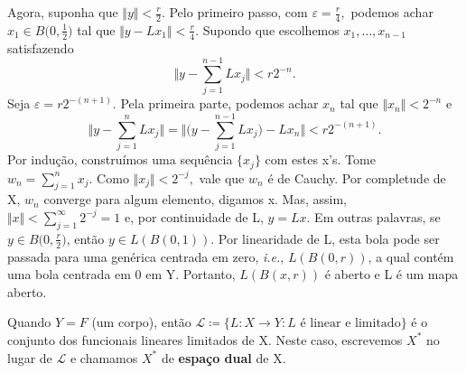 \documentclass[measure_theory.tex]{subfiles}
\begin{document}
\begin{proof*}
	Agora, suponha que \(\Vert y \Vert < \frac{r}{2}.\) Pelo primeiro passo, com \(\varepsilon  = \frac{r}{4}, \) podemos achar \(x_1\in B \biggl(0, \frac{1}{2}\biggr)\) tal que \(\Vert y - Lx_1 \Vert < \frac{r}{4}.\) Supondo que escolhemos \(x_1, \dotsc , x_{n-1}\) satisfazendo
	\[
		\biggl\Vert y - \sum\limits_{j=1}^{n-1}Lx_{j} \biggr\Vert < r2^{-n}.
	\]
	Seja \(\varepsilon  = r2^{-(n+1)}.\) Pela primeira parte, podemos achar \(x_{n}\) tal que \(\Vert x_{n} \Vert < 2^{-n}\) e
	\[
		\biggl\Vert y - \sum\limits_{j=1}^{n}Lx_{j} \biggr\Vert = \biggl\Vert \biggl(y - \sum\limits_{j=1}^{n-1}Lx_{j}\biggr) - Lx_{n} \biggr\Vert < r2^{-(n+1)}.
	\]
	Por indução, construímos uma sequência \(\{x_{j}\}\) com estes x's. Tome \(w_{n} = \sum\limits_{j=1}^{n}x_{j}.\) Como \(\Vert x_{j} \Vert < 2^{-j},\) vale que \(w_{n}\) é de Cauchy. Por completude de X, \(w_{n}\) converge para algum elemento, digamos x. Mas, assim, \(\Vert x \Vert <
	\sum\limits_{j=1}^{\infty} 2^{-j} = 1\) e, por continuidade de L, \(y = Lx\). Em outras palavras, se \(y\in B \biggl(0, \frac{r}{2}\biggr)\), então \(y\in L(B(0, 1))\). Por linearidade de L, esta bola pode ser passada para uma genérica centrada em zero, \textit{i.e.}, \(L(B(0, r))\), a qual contém
	uma bola centrada em 0 em Y. Portanto, \(L(B(x, r))\) é aberto e L é um mapa aberto. \qedsymbol
\end{proof*}
Quando \(Y = F\) (um corpo), então \(\mathcal{L}\coloneqq \{L:X\rightarrow Y: L \text{ é linear e limitado}\}\) é o conjunto dos funcionais lineares limitados de X. Neste caso, escrevemos \(X^{*}\) no lugar de \(\mathcal{L}\) e chamamos \(X^{*}\) de \textbf{espaço dual} de X.
\end{document}
